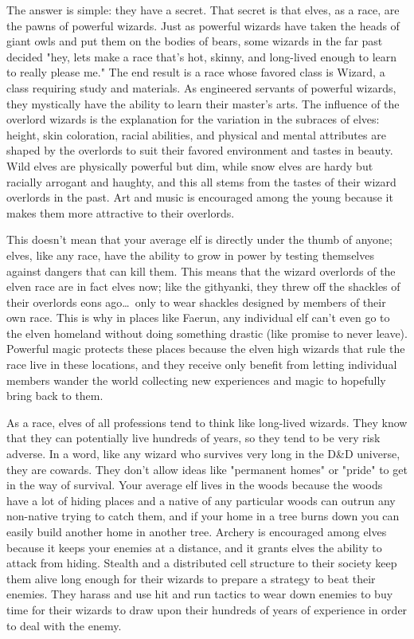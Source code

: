 The answer is simple: they have a secret. That secret is that elves, as a race, are the pawns of powerful wizards. Just as powerful wizards have taken the heads of giant owls and put them on the bodies of bears, some wizards in the far past decided "hey, lets make a race that's hot, skinny, and long-lived enough to learn to really please me." The end result is a race whose favored class is Wizard, a class requiring study and materials. As engineered servants of powerful wizards, they mystically have the ability to learn their master's arts. The influence of the overlord wizards is the explanation for the variation in the subraces of elves: height, skin coloration, racial abilities, and physical and mental attributes are shaped by the overlords to suit their favored environment and tastes in beauty. Wild elves are physically powerful but dim, while snow elves are hardy but racially arrogant and haughty, and this all stems from the tastes of their wizard overlords in the past. Art and music is encouraged among the young because it makes them more attractive to their overlords.

This doesn't mean that your average elf is directly under the thumb of anyone; elves, like any race, have the ability to grow in power by testing themselves against dangers that can kill them. This means that the wizard overlords of the elven race are in fact elves now; like the githyanki, they threw off the shackles of their overlords eons ago\ldots\ only to wear shackles designed by members of their own race. This is why in places like Faerun, any individual elf can't even go to the elven homeland without doing something drastic (like promise to never leave). Powerful magic protects these places because the elven high wizards that rule the race live in these locations, and they receive only benefit from letting individual members wander the world collecting new experiences and magic to hopefully bring back to them.

As a race, elves of all professions tend to think like long-lived wizards. They know that they can potentially live hundreds of years, so they tend to be very risk adverse. In a word, like any wizard who survives very long in the D\&D universe, they are cowards. They don't allow ideas like "permanent homes" or "pride" to get in the way of survival. Your average elf lives in the woods because the woods have a lot of hiding places and a native of any particular woods can outrun any non-native trying to catch them, and if your home in a tree burns down you can easily build another home in another tree. Archery is encouraged among elves because it keeps your enemies at a distance, and it grants elves the ability to attack from hiding. Stealth and a distributed cell structure to their society keep them alive long enough for their wizards to prepare a strategy to beat their enemies. They harass and use hit and run tactics to wear down enemies to buy time for their wizards to draw upon their hundreds of years of experience in order to deal with the enemy.

